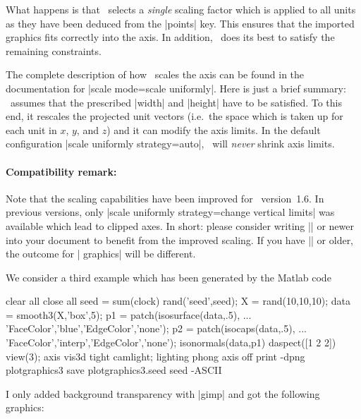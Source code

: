 {{\begin{codeexample}[]
\end{codeexample}
\noindent What happens is that \PGFPlots\ selects a \emph{single} scaling factor which is applied to all units as they have been deduced from the |points| key. This ensures that the imported graphics fits correctly into the axis. In addition, \PGFPlots\ does its best to satisfy the remaining constraints. 

The complete description of how \PGFPlots\ scales the axis can be found in the documentation for |scale mode=scale uniformly|. Here is just a brief summary: \PGFPlots\ assumes that the prescribed |width| and |height| have to be satisfied. To this end, it rescales the projected unit vectors (i.e.\ the space which is taken up for each unit in $x$, $y$, and $z$) and it can modify the axis limits. In the default configuration |scale uniformly strategy=auto|, \PGFPlots\ will \emph{never} shrink axis limits.  

\paragraph{Compatibility remark:} Note that the scaling capabilities have been improved for \PGFPlots\ version~1.6. In previous versions, only |scale uniformly strategy=change vertical limits| was available which lead to clipped axes. In short: please consider writing |\pgfplotsset{compat=1.6}| or newer into your document to benefit from the improved scaling. If you have |\pgfplotsset{compat=1.5}| or older, the outcome for | graphics| will be different.

We consider a third example which has been generated by the Matlab code
\begin{codeexample}
clear all
close all
seed = sum(clock)
rand('seed',seed);
X = rand(10,10,10);
data = smooth3(X,'box',5);
p1 = patch(isosurface(data,.5), ...
   'FaceColor','blue','EdgeColor','none');
p2 = patch(isocaps(data,.5), ...
    'FaceColor','interp','EdgeColor','none');
isonormals(data,p1)
daspect([1 2 2])
view(3); axis vis3d tight
camlight; lighting phong
axis off
print -dpng plotgraphics3
save  plotgraphics3.seed seed -ASCII %
\end{codeexample}
\noindent I only added background transparency with |gimp| and got the following graphics:

}}
